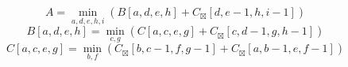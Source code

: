 \documentclass{article}
\begin{document}
$$ A =\min_{ a,d,e,h,i } \left( B\left[a,d,e,h\right]+C_{\boxtimes}\left[d,e-1,h,i-1\right]\right) $$
$$ B\left[ a,d,e,h \right] =\min_{ c,g } \left( C\left[a,c,e,g\right]+C_{\boxtimes}\left[c,d-1,g,h-1\right]\right) $$
$$ C\left[ a,c,e,g \right] =\min_{ b,f } \left( C_{\boxtimes}\left[b,c-1,f,g-1\right]+C_{\boxtimes}\left[a,b-1,e,f-1\right]\right) $$
\end{document}
